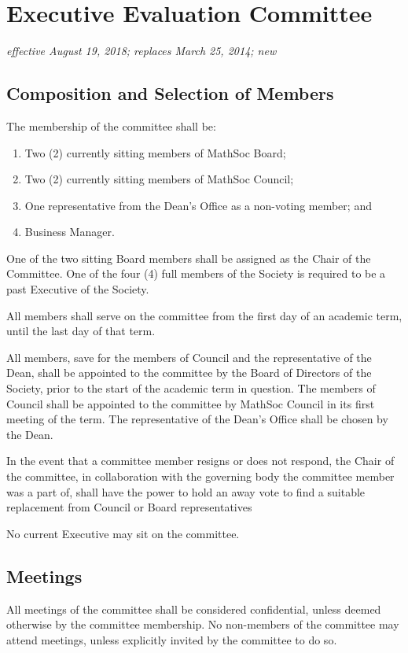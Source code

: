 \section{Executive Evaluation Committee}
\emph{effective August 19, 2018; replaces March 25, 2014; new}

\subsection{Composition and Selection of Members}
The membership of the committee shall be:
\begin{enumerate}
    \item Two (2) currently sitting members of MathSoc Board;
    \item Two (2) currently sitting members of MathSoc Council;
    \item One representative from the Dean's Office as a non-voting member; and
    \item Business Manager.
\end{enumerate}

One of the two sitting Board members shall be assigned as the Chair of the Committee.
One of the four (4) full members of the Society is required to be a past Executive of the Society.
 
All members shall serve on the committee from the first day of an academic
term, until the last day of that term.

All members, save for the members of Council and the representative of the
Dean, shall be appointed to the committee by the Board of Directors of the
Society, prior to the start of the academic term in question. The members of
Council shall be appointed to the committee by MathSoc Council in its first
meeting of the term. The representative of the Dean's Office shall be chosen by
the Dean.

In the event that a committee member resigns or does not respond, the Chair of the committee, in collaboration with the governing body the committee member was a part of, shall have the power to hold an away vote to find a suitable replacement from Council or Board representatives

No current Executive may sit on the committee.

\subsection{Meetings}

All meetings of the committee shall be considered confidential, unless deemed
otherwise by the committee membership. No non-members of the committee may
attend meetings, unless explicitly invited by the committee to do so.

